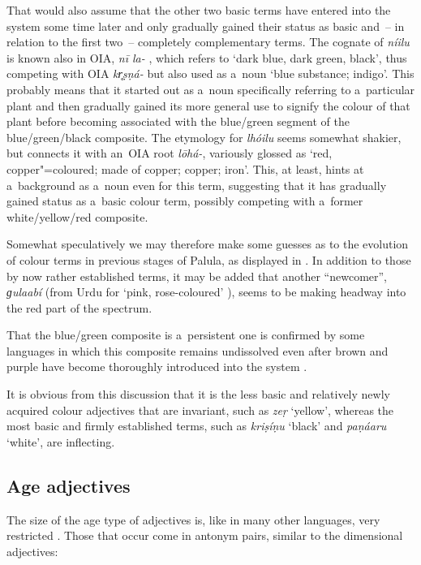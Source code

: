 That would also assume that the other two basic terms have entered into the system some time later
and only gradually gained their status as basic and~-- in relation to the first two~-- completely
complementary terms. The cognate of \textit{níilu} is known also in OIA, \textit{nī la-}
\citep[7563]{turner1966}, which refers to `dark blue, dark green, black', thus competing with OIA
\textit{kr̥ṣṇá-} but also used as a~noun `blue substance; indigo'. This probably means that it
started out as a~noun specifically referring to a~particular plant and then gradually gained its
more general use to signify the colour of that plant before becoming associated with the blue/green
segment of the blue/green/black composite. The etymology for \textit{lhóilu} seems somewhat shakier,
but \citet[11168, 11158]{turner1966} connects it with an~OIA root \textit{lōhá-}, variously glossed
as `red, copper"=coloured; made of copper; copper; iron'. This, at least, hints at a~background as
a~noun even for this term, suggesting that it has gradually gained status as a~basic colour term,
possibly competing with a~former white/yellow/red composite.



Somewhat speculatively we may therefore make some guesses as to the evolution of colour terms in previous stages of Palula, as displayed in . In addition to those by now rather established terms, it may be added that another ``newcomer'', \textit{ɡulaabí} (from Urdu for `pink, rose-coloured' ), seems to be making headway into the red part of the spectrum.



That the blue/green composite is a~persistent one is confirmed by some languages in which this composite remains undissolved even after brown and purple have become thoroughly introduced into the system \citep[18]{kayetal1991}.



It is obvious from this discussion that it is the less basic and relatively newly acquired colour adjectives that are invariant, such as \textit{zeṛ} `yellow', whereas the most basic and firmly established terms, such as \textit{kriṣíṇu} `black' and \textit{paṇáaru} `white', are inflecting. 


\subsection{Age adjectives}
\label{subsec:6-2-3}


The size of the age type of adjectives is, like in many other languages, very restricted \citep[46]{dixon1982}. Those that occur come in antonym pairs, similar to the dimensional adjectives:



